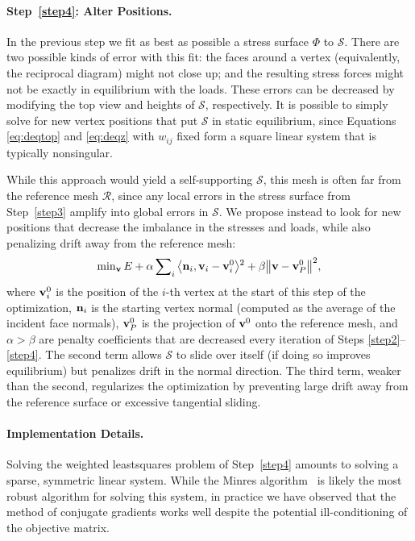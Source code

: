\documentclass[review]{acmsiggraph}
\def\<{\mathchoice{\big\langle}{\langle}{\langle}{\langle}}
\def\>{\mathchoice{\big\rangle}{\rangle}{\rangle}{\rangle}}
\def\SS{{\mathcal S}}
\def\RR{{\mathcal R}}
\begin{document}
\paragraph{Step~\ref{step4}: Alter Positions.} In the previous step we fit
as best as possible a stress surface $\Phi$ to $\SS$. There are two
possible kinds of error with this fit: the faces around a vertex
(equivalently, the reciprocal diagram) might not close up; and the
resulting stress forces might not be exactly in equilibrium with the
loads. These errors can be decreased by modifying the top view and heights
of $\SS$, respectively. It is possible to simply solve for new vertex
positions that put $\SS$ in static equilibrium, since Equations
\eqref{eq:deqtop} and \eqref{eq:deqz} with $w_{ij}$ fixed form a square
linear system that is typically nonsingular.

While this approach would yield a self-supporting $\SS$, this mesh is
often far from the reference mesh $\RR$, since any local errors in the
stress surface from Step~\ref{step3} amplify into global errors in $\SS$.
We propose instead to look for new positions that decrease the imbalance
in the stresses and loads, while also penalizing drift away from the
reference mesh:
	\begin{align*}
	\min\nolimits_{\vw} E
	+ \alpha \sum\nolimits_i
		\<\nw_i, \vw_i - \vw^0_i \>^2
		+ \beta \big\|\vw - \vw^0_P\big\|^2,
	\end{align*}
 where ${\mathbf v}^0_i$ is the position of the $i$-th vertex at the start of this
step of the optimization, ${\mathbf n}_i$ is the starting vertex normal (computed
as the average of the incident face normals), ${\mathbf v}^0_P$ is the projection
of ${\mathbf v}^0$ onto the reference mesh, and $\alpha > \beta$ are penalty
coefficients that are decreased every iteration of Steps
\ref{step2}--\ref{step4}. The second term allows $\SS$ to
slide over itself (if doing so improves equilibrium) but penalizes drift
in the normal direction. The third term, weaker than the second,
regularizes the optimization by preventing large drift away from the
reference surface or excessive tangential sliding.

\paragraph{Implementation Details.}

Solving the weighted least\dash squares problem of Step~\ref{step4}
amounts to solving a sparse, symmetric linear system. While the {\sc Minres}
algorithm~\cite{paige75} is likely the most robust algorithm for solving
this system, in practice we have observed that the method of conjugate
gradients works well despite the potential ill-conditioning of the
objective matrix.
\end{document}
